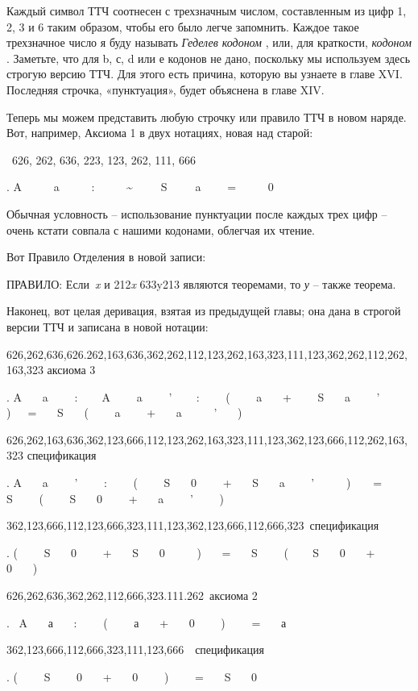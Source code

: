 \documentclass[../main.tex]{subfiles}
\begin{document}
Каждый символ ТТЧ соотнесен с трехзначным числом, составленным из цифр 1, 2, 3 и 6 таким образом, чтобы его было легче запомнить. Каждое такое трехзначное число я буду называть \emph{Геделев кодоном} , или, для краткости, \emph{кодоном} . Заметьте, что для b, с, d или е кодонов не дано, поскольку мы используем здесь строгую версию ТТЧ\@. Для этого есть причина, которую вы узнаете в главе XVI\@. Последняя строчка, «пунктуация», будет объяснена в главе XIV.

Теперь мы можем представить любую строчку или правило ТТЧ в новом наряде. Вот, например, Аксиома 1 в двух нотациях, новая над старой:

~626, 262, 636, 223, 123, 262, 111, 666

. A~~~~~ a~~~~ ~:~~~~~ \textasciitilde~~~~~S~~~~~a~~~~ =~~~~~ 0

Обычная условность \--- использование пунктуации после каждых трех цифр \--- очень кстати совпала с нашими кодонами, облегчая их чтение.

Вот Правило Отделения в новой записи:

ПРАВИЛО: Если~\emph{x} и 212\emph{x} 633y213 являются теоремами, то \emph{у} \--- также теорема.

Наконец, вот целая деривация, взятая из предыдущей главы; она дана в строгой версии ТТЧ и записана в новой нотации:

626,262,636,626.262,163,636,362,262,112,123,262,163,323,111,123,362,262,112,262,163,323 аксиома 3

. A~~~ a~~~~ :~ ~~ A~~~ ~a~~~~ '~~ ~ :~~~~ (~~~ ~a~~~ +~~~~ S~~~ a~~~~ '~~~~ )~~~=~~~ S~~~ (~~~~ a~~~~ +~~~ a~~~~~ '~~~ )

626,262,163,636,362,123,666,112,123,262,163,323,111,123,362,123,666,112,262,163,323 спецификация

. A~~~ a~~~~ '~~~~ :~~~~ (~~~~ S~~ ~0~~~~ +~~~ S~~~ a~~~~ '~~~~~ )~~~~=~~~ S~~~~ (~~~~ S~~~ 0~~~~ +~~~ a~~~~ '~~~~ )

362,123,666,112,123,666,323,111,123,362,123,666,112,666,323~спецификация

. (~~~~ S~~~ 0~~~~ +~~~ S~~~ 0~~~~~ )~~~ =~~~ S~~~~ ( ~~~ S~~~ 0~~~ +~~~~ 0~~~ )

626,262,636,362,262,112,666,323.111.262~аксиома 2

.~ A~~~ а~~ ~:~~~~ (~~~~ а~~~ +~~~ 0~~~ ~)~~~~ =~~~ а

362,123,666,112,666,323,111,123,666~~спецификация

. (~~~~ S~~~~ 0~~~ +~~ ~0~~~~ )~~~~ =~~~ S~~~ 0
\end{document}
